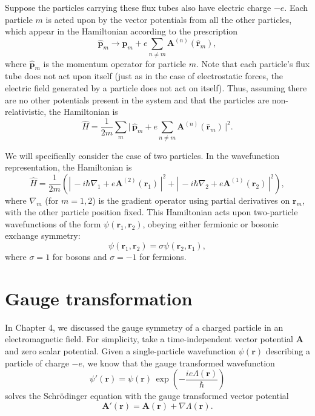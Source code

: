 \documentclass[pra,12pt]{revtex4}
\begin{document}
Suppose the particles carrying these flux tubes also have electric
charge $-e$.  Each particle $m$ is acted upon by the vector potentials
from all the other particles, which appear in the Hamiltonian
according to the prescription
\begin{equation}
  \hat{\mathbf{p}}_m \rightarrow \hat{\mathbf{p}}_m
  + e \sum_{n \ne m} \mathbf{A}^{(n)}(\hat{\mathbf{r}}_m),
\end{equation}
where $\hat{\mathbf{p}}_m$ is the momentum operator for particle $m$.
Note that each particle's flux tube does not act upon itself (just as
in the case of electrostatic forces, the electric field generated by a
particle does not act on itself).  Thus, assuming there are no other
potentials present in the system and that the particles are
non-relativistic, the Hamiltonian is
\begin{equation}
  \hat{H} = \frac{1}{2m} \sum_m \Big| \,\hat{\mathbf{p}}_m
  + e \sum_{n \ne m} \mathbf{A}^{(n)}(\hat{\mathbf{r}}_m)\,\Big|^2.
\end{equation}

We will specifically consider the case of two particles.  In the
wavefunction representation, the Hamiltonian is
\begin{equation}
  \hat{H} = \frac{1}{2m} \left( \left| \, -i\hbar \nabla_1
  + e\mathbf{A}^{(2)}(\mathbf{r}_1)\,\right|^2
  + \left| \, -i\hbar \nabla_2
  + e\mathbf{A}^{(1)}(\mathbf{r}_2)\,\right|^2\right),
  \label{HamA}
\end{equation}
where $\nabla_m$ (for $m = 1,2$) is the gradient operator using
partial derivatives on $\mathbf{r}_m$, with the other particle
position fixed.  This Hamiltonian acts upon two-particle wavefunctions
of the form $\psi(\mathbf{r}_1, \mathbf{r}_2)$, obeying either
fermionic or bosonic exchange symmetry:
\begin{equation}
  \psi(\mathbf{r}_1, \mathbf{r}_2) = \sigma \psi(\mathbf{r}_2, \mathbf{r}_1),
  \label{exchange}
\end{equation}
where $\sigma = 1$ for bosons and $\sigma = -1$ for fermions.

\section{Gauge transformation}

In Chapter 4, we discussed the gauge symmetry of a charged particle in
an electromagnetic field.  For simplicity, take a time-independent
vector potential $\mathbf{A}$ and zero scalar potential.  Given a
single-particle wavefunction $\psi(\mathbf{r})$ describing a particle
of charge $-e$, we know that the gauge transformed wavefunction
\begin{equation}
  \psi'(\mathbf{r}) = \psi(\mathbf{r}) \,
  \exp\!\left(-\frac{ie\Lambda(\mathbf{r})}{\hbar}\right)
\end{equation}
solves the Schr\"odinger equation with the gauge transformed vector
potential
\begin{equation*}
  \mathbf{A}'(\mathbf{r}) = \mathbf{A}(\mathbf{r}) + \nabla \Lambda(\mathbf{r}).
\end{equation*}
\end{document}
